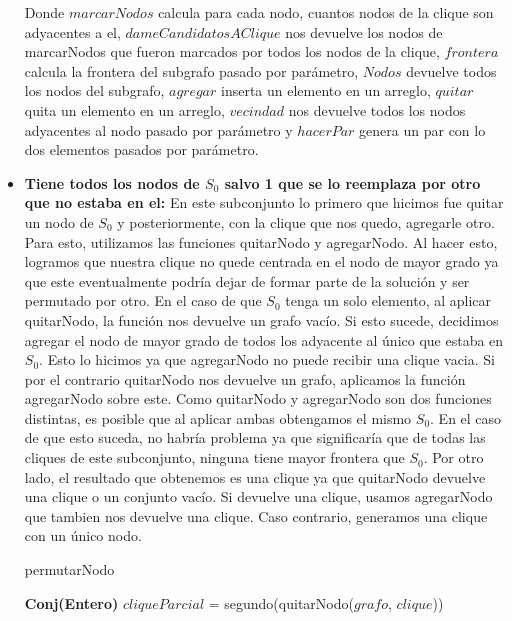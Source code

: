 \begin{itemize}
Donde $marcarNodos$ calcula para cada nodo, cuantos nodos de la clique son adyacentes a el, $dameCandidatosAClique$ nos devuelve los nodos de marcarNodos que fueron marcados por todos los nodos de la clique, $frontera$ calcula la frontera del subgrafo pasado por parámetro, $Nodos$ devuelve todos los nodos del subgrafo, $agregar$ inserta un elemento en un arreglo, $quitar$ quita un elemento en un arreglo, $vecindad$ nos devuelve todos los nodos adyacentes al nodo pasado por parámetro y $hacerPar$ genera un par con lo dos elementos pasados por parámetro. \newline

\item \textbf{Tiene todos los nodos de $S_{0}$ salvo 1 que se lo reemplaza por otro que no estaba en el:} \newline
En este subconjunto lo primero que hicimos fue quitar un nodo de $S_{0}$ y posteriormente, con la clique que nos quedo, agregarle otro. Para esto, utilizamos las funciones quitarNodo y agregarNodo. Al hacer esto, logramos que nuestra clique no quede centrada en el nodo de mayor grado ya que este eventualmente podría dejar de formar parte de la solución y ser permutado por otro.\newline
En el caso de que $S_{0}$ tenga un solo elemento, al aplicar quitarNodo, la función nos devuelve un grafo vacío. Si esto sucede, decidimos agregar el nodo de mayor grado de todos los adyacente al único que estaba en $S_{0}$. Esto lo hicimos ya que agregarNodo no puede recibir una clique vacia.\newline
Si por el contrario quitarNodo nos devuelve un grafo, aplicamos la función agregarNodo sobre este. \newline
Como quitarNodo y agregarNodo son dos funciones distintas, es posible que al aplicar ambas obtengamos el mismo $S_{0}$. En el caso de que esto suceda, no habría problema ya que significaría que de todas las cliques de este subconjunto, ninguna tiene mayor frontera que $S_{0}$. Por otro lado, el resultado que obtenemos es una clique ya que quitarNodo devuelve una clique o un conjunto vacío. Si devuelve una clique, usamos agregarNodo que tambien nos devuelve una clique. Caso contrario, generamos una clique con un único nodo.
\begin{algorithm}[H]
    \SetAlgoLined
    \caption{permutarNodo}
	
   \textbf{Conj(Entero)} $cliqueParcial$ = segundo(quitarNodo($grafo$, $clique$)) \\


\end{algorithm}
\end{itemize}
